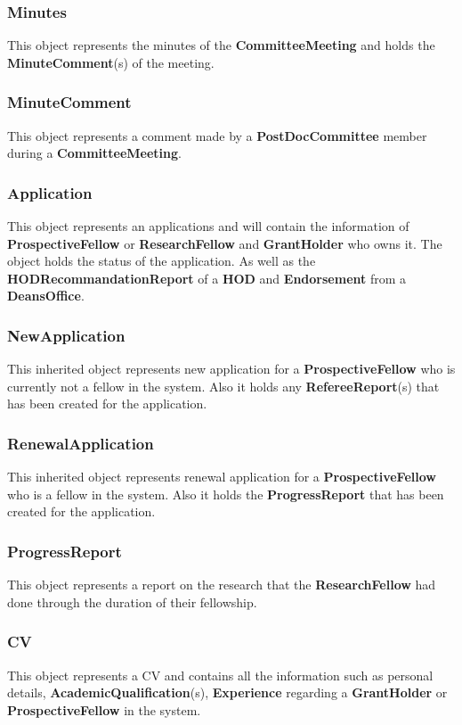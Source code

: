 \documentclass[12pt]{article}
\begin{document}
\subsubsection{Minutes}
This object represents the minutes of the \textbf{CommitteeMeeting} and holds the \textbf{MinuteComment}(s) of the meeting.

\subsubsection{MinuteComment}
This object represents a comment made by a \textbf{PostDocCommittee} member during a \textbf{CommitteeMeeting}.

\subsubsection{Application}
This object represents an applications and will contain the information of \textbf{ProspectiveFellow} or \textbf{ResearchFellow} and \textbf{GrantHolder} who owns it. The object holds the status of the application. As well as the \textbf{HODRecommandationReport} of a \textbf{HOD} and \textbf{Endorsement} from a \textbf{DeansOffice}.

\subsubsection{NewApplication}
This inherited object represents new application for a \textbf{ProspectiveFellow} who is currently not a fellow in the system. Also it holds any \textbf{RefereeReport}(s) that has been created for the application.

\subsubsection{RenewalApplication}
This inherited object represents renewal application for a \textbf{ProspectiveFellow} who is a fellow in the system. Also it holds the \textbf{ProgressReport} that has been created for the application.

\subsubsection{ProgressReport}
This object represents a report on the research that the \textbf{ResearchFellow} had done through the duration of their fellowship.

\subsubsection{CV}
This object represents a CV and contains all the information such as personal details, \textbf{AcademicQualification}(s), \textbf{Experience} regarding a \textbf{GrantHolder} or \textbf{ProspectiveFellow} in the system.
\end{document}
